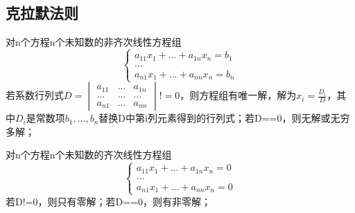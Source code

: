 \subsection{克拉默法则}

对n个方程n个未知数的非齐次线性方程组
\[
\begin{cases}
a_{11}x_{1} +...+ a_{1n}x_{n} = b_1 \\ 
... \\ 
a_{n1}x_{1} +...+ a_{nn}x_{n} = b_n
\end{cases}
\]
若系数行列式\(D = 
\begin{vmatrix}
a_{11} & ... & a_{1n} \\ 
... & ... & ... \\ 
a_{n1} & ... & a_{nn}
\end{vmatrix} != 0
\)，则方程组有唯一解，解为\(x_i = \frac{D_i}{D}\)，其中\(D_i\)是常数项\(b_1, ..., b_n\)替换D中第i列元素得到的行列式；若D==0，则无解或无穷多解；

对n个方程n个未知数的齐次线性方程组
\[
\begin{cases}
a_{11}x_{1} +...+ a_{1n}x_{n} = 0 \\ 
... \\ 
a_{n1}x_{1} +...+ a_{nn}x_{n} = 0
\end{cases}
\]
若D!=0，则只有零解；若D==0，则有非零解；


